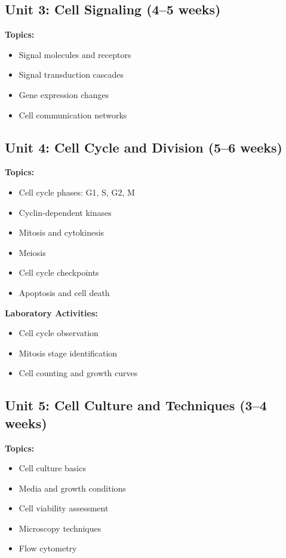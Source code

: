 \documentclass[12pt,oneside]{book}
\begin{document}
\subsection{Unit 3: Cell Signaling (4--5 weeks)}

\textbf{Topics:}
\begin{itemize}
    \item Signal molecules and receptors
    \item Signal transduction cascades
    \item Gene expression changes
    \item Cell communication networks
\end{itemize}

\subsection{Unit 4: Cell Cycle and Division (5--6 weeks)}

\textbf{Topics:}
\begin{itemize}
    \item Cell cycle phases: G1, S, G2, M
    \item Cyclin-dependent kinases
    \item Mitosis and cytokinesis
    \item Meiosis
    \item Cell cycle checkpoints
    \item Apoptosis and cell death
\end{itemize}

\textbf{Laboratory Activities:}
\begin{itemize}
    \item Cell cycle observation
    \item Mitosis stage identification
    \item Cell counting and growth curves
\end{itemize}

\subsection{Unit 5: Cell Culture and Techniques (3--4 weeks)}

\textbf{Topics:}
\begin{itemize}
    \item Cell culture basics
    \item Media and growth conditions
    \item Cell viability assessment
    \item Microscopy techniques
    \item Flow cytometry
\end{itemize}
\end{document}
